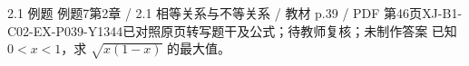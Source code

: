 \par\noindent\begin{minipage}{\linewidth}
\begin{bankitem}{2.1 例题 例题7}{第2章 / 2.1 相等关系与不等关系 / 教材 p.39 / PDF 第46页}{XJ-B1-C02-EX-P039-Y1344}{已对照原页转写题干及公式；待教师复核；未制作答案}
已知 $0<x<1$，求 $\sqrt{x(1-x)}$ 的最大值。
\end{bankitem}
\end{minipage}\par\medskip
